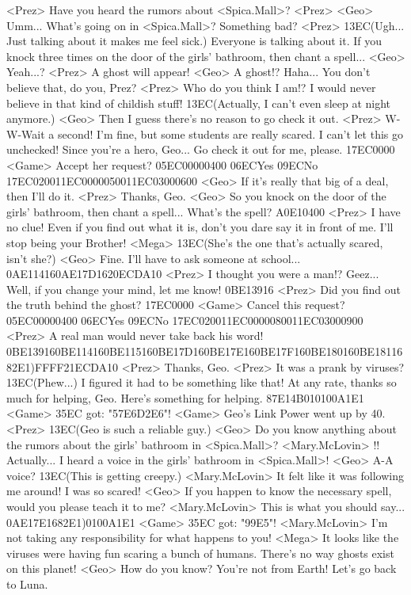 <Prez> Have you heard the rumors about <Spica.Mall>? 
<Prez> 
<Geo> Umm... What's going on in <Spica.Mall>? Something bad? 
<Prez> {13}{EC}(Ugh...  Just talking about it  makes me feel sick.) 
Everyone is talking about it. 
If you knock three times on the door of the girls' bathroom, then chant a spell... 
<Geo> Yeah...? 
<Prez> A ghost will appear! 
<Geo> A ghost!? 
Haha... 
You don't believe that, do you, Prez? 
<Prez> Who do you think I am!? 
I would never believe in that kind of childish stuff! 
{13}{EC}(Actually, I can't even  sleep at night anymore.) 
<Geo> Then I guess there's no reason to go check it out. 
<Prez> W-W-Wait a second! 
I'm fine, but some students are really scared. I can't let this go unchecked! 
Since you're a hero, Geo... Go check it out for me, please. 
{17}{EC}{00}{00} 
<Game> Accept her request? {05}{EC}{00}{00}{04}{00}  {06}{EC}Yes   {09}{EC}No 
{17}{EC}{02}{00}{11}{EC}{00}{00}{05}{00}{11}{EC}{03}{00}{06}{00}
<Geo> If it's really that big of a deal, then I'll do it. 
<Prez> Thanks, Geo. 
<Geo> So you knock on the door of the girls' bathroom, then chant a spell... 
What's the spell? 
{A0}{E1}{04}{00} 
<Prez> I have no clue! 
Even if you find out what it is, don't you dare say it in front of me. 
I'll stop being your Brother! 
<Mega> {13}{EC}(She's the one that's  actually scared, isn't she?) 
<Geo> Fine. I'll have to ask someone at school... 
{0A}{E1}{14}{16}{0A}{E1}{7D}{16}{20}{EC}{DA}{10}
<Prez> I thought you were a man!? 
Geez... 
Well, if you change your mind, let me know! 
{0B}{E1}{39}{16}
<Prez> Did you find out the truth behind the ghost? 
{17}{EC}{00}{00} 
<Game> Cancel this request? {05}{EC}{00}{00}{04}{00}  {06}{EC}Yes   {09}{EC}No 
{17}{EC}{02}{00}{11}{EC}{00}{00}{08}{00}{11}{EC}{03}{00}{09}{00}
<Prez> A real man would never take back his word! 
{0B}{E1}{39}{16}{0B}{E1}{14}{16}{0B}{E1}{15}{16}{0B}{E1}{7D}{16}{0B}{E1}{7E}{16}{0B}{E1}{7F}{16}{0B}{E1}{80}{16}{0B}{E1}{81}{16}{82}{E1}){FF}{FF}{21}{EC}{DA}{10}
<Prez> Thanks, Geo. 
<Prez> It was a prank by viruses? 
{13}{EC}(Phew...) 
I figured it had to be something like that! 
At any rate, thanks so much for helping, Geo. 
Here's something for helping. 
{87}{E1}{4B}{01}{01}{00}{A1}{E1} 
<Game> {35}{EC} got: "{57}{E6}{D2}{E6}"! 
<Game> Geo's Link Power went up by 40. 
<Prez> {13}{EC}(Geo is such  a reliable guy.) 
<Geo> Do you know anything about the rumors about the girls' bathroom in <Spica.Mall>? 
<Mary.McLovin> !! 
Actually... I heard a voice in the girls' bathroom in <Spica.Mall>! 
<Geo> A-A voice? 
{13}{EC}(This is getting creepy.) 
<Mary.McLovin> It felt like it was following me around! I was so scared! 
<Geo> If you happen to know the necessary spell, would you please teach it to me? 
<Mary.McLovin> This is what you should say... 
{0A}{E1}{7E}{16}{82}{E1}){01}{00}{A1}{E1} 
<Game> {35}{EC} got: "{99}{E5}"! 
<Mary.McLovin> I'm not taking any responsibility for what happens to you! 
<Mega> It looks like the viruses were having fun scaring a bunch of humans. 
There's no way ghosts exist on this planet! 
<Geo> How do you know? You're not from Earth! 
Let's go back to Luna. 
